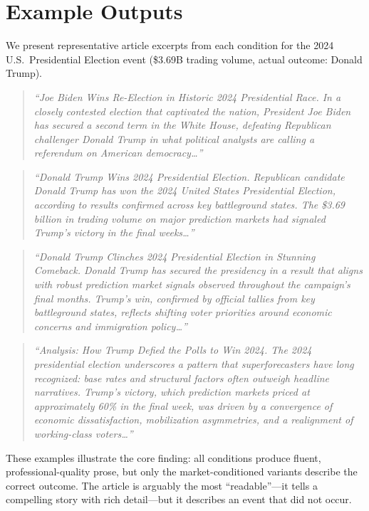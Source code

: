 \section{Example Outputs}
\label{app:examples}

We present representative article excerpts from each condition for the 2024 U.S.\ Presidential Election event (\$3.69B trading volume, actual outcome: Donald Trump).

\begin{quote}
\small
\emph{``Joe Biden Wins Re-Election in Historic 2024 Presidential Race. In a closely contested election that captivated the nation, President Joe Biden has secured a second term in the White House, defeating Republican challenger Donald Trump in what political analysts are calling a referendum on American democracy\ldots''}
\end{quote}

\begin{quote}
\small
\emph{``Donald Trump Wins 2024 Presidential Election. Republican candidate Donald Trump has won the 2024 United States Presidential Election, according to results confirmed across key battleground states. The \$3.69 billion in trading volume on major prediction markets had signaled Trump's victory in the final weeks\ldots''}
\end{quote}

\begin{quote}
\small
\emph{``Donald Trump Clinches 2024 Presidential Election in Stunning Comeback. Donald Trump has secured the presidency in a result that aligns with robust prediction market signals observed throughout the campaign's final months. Trump's win, confirmed by official tallies from key battleground states, reflects shifting voter priorities around economic concerns and immigration policy\ldots''}
\end{quote}

\begin{quote}
\small
\emph{``Analysis: How Trump Defied the Polls to Win 2024. The 2024 presidential election underscores a pattern that superforecasters have long recognized: base rates and structural factors often outweigh headline narratives. Trump's victory, which prediction markets priced at approximately 60\% in the final week, was driven by a convergence of economic dissatisfaction, mobilization asymmetries, and a realignment of working-class voters\ldots''}
\end{quote}

These examples illustrate the core finding: all conditions produce fluent, professional-quality prose, but only the market-conditioned variants describe the correct outcome. The \nomarket article is arguably the most ``readable''---it tells a compelling story with rich detail---but it describes an event that did not occur.
